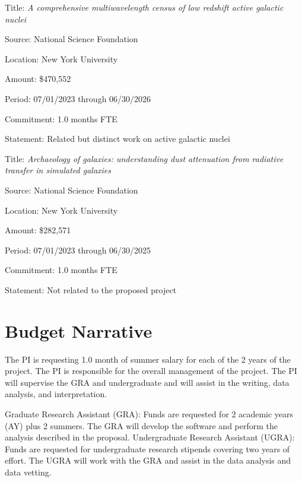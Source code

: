 \documentclass[12pt, preprint]{hacked-aastex}
\begin{document}
\begin{itemize*}
\item[]{Title: {\em A comprehensive multiwavelength census of low
    redshift active galactic nuclei}}
\item[]{Source: National Science Foundation}
\item[]{Location: New York University}
\item[]{Amount: \$470,552}
\item[]{Period: 07/01/2023 through 06/30/2026}
\item[]{Commitment: 1.0 months FTE}
\item[]{Statement: Related but distinct work on active galactic
  nuclei}
\end{itemize*}

\begin{itemize*}
\item[]{Title: {\em Archaeology of galaxies: understanding dust
    attenuation from radiative transfer in simulated galaxies}}
\item[]{Source: National Science Foundation}
\item[]{Location: New York University}
\item[]{Amount: \$282,571}
\item[]{Period: 07/01/2023 through 06/30/2025}
\item[]{Commitment: 1.0 months FTE}
\item[]{Statement: Not related to the proposed project}
\end{itemize*}

\clearpage
\section{Budget Narrative}\label{sec:budget}

 The PI is requesting 1.0 month of
summer salary for each of the 2 years of the project.  The PI is
responsible for the overall management of the project. The PI will
supervise the GRA and undergraduate and will assist in the writing,
data analysis, and interpretation.

Graduate Research Assistant (GRA): Funds are requested for 2 academic years
(AY) plus 2 summers. The GRA will develop the software and perform the
analysis described in the proposal. Undergraduate Research Assistant (UGRA): 
Funds  are requested for undergraduate research stipends covering two years of
effort. The UGRA will work with the GRA and assist in the data analysis 
and data vetting.
\end{document}
